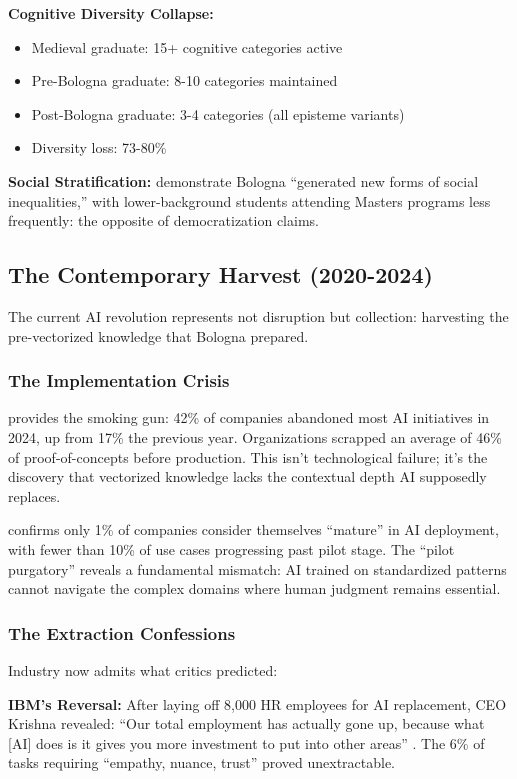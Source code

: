 \textbf{Cognitive Diversity Collapse:}
\begin{itemize}
\item Medieval graduate: 15+ cognitive categories active
\item Pre-Bologna graduate: 8-10 categories maintained
\item Post-Bologna graduate: 3-4 categories (all episteme variants)
\item Diversity loss: 73-80\%
\end{itemize}

\textbf{Social Stratification:} \citet{kroher2021} demonstrate Bologna ``generated new forms of social inequalities,'' with lower-background students attending Masters programs less frequently: the opposite of democratization claims.

\subsection{The Contemporary Harvest (2020-2024)}

The current AI revolution represents not disruption but collection: harvesting the pre-vectorized knowledge that Bologna prepared.

\subsubsection{The Implementation Crisis}

\citet{spglobal2025} provides the smoking gun: 42\% of companies abandoned most AI initiatives in 2024, up from 17\% the previous year. Organizations scrapped an average of 46\% of proof-of-concepts before production. This isn't technological failure; it's the discovery that vectorized knowledge lacks the contextual depth AI supposedly replaces.

\citet{mckinsey2025} confirms only 1\% of companies consider themselves ``mature'' in AI deployment, with fewer than 10\% of use cases progressing past pilot stage. The ``pilot purgatory'' reveals a fundamental mismatch: AI trained on standardized patterns cannot navigate the complex domains where human judgment remains essential.

\subsubsection{The Extraction Confessions}

Industry now admits what critics predicted:

\textbf{IBM's Reversal:} After laying off 8,000 HR employees for AI replacement, CEO Krishna revealed: ``Our total employment has actually gone up, because what [AI] does is it gives you more investment to put into other areas'' \citep{krishna2024}. The 6\% of tasks requiring ``empathy, nuance, trust'' proved unextractable.

